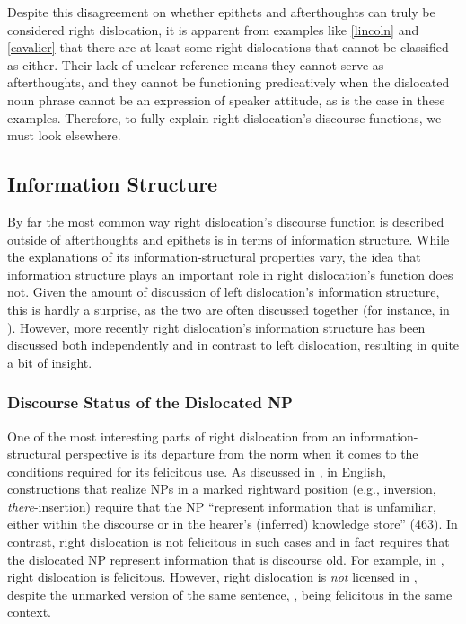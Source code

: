 \documentclass[titlepage,12pt]{article}
\begin{document}
Despite this disagreement on whether epithets and afterthoughts can truly be considered right dislocation, it is apparent from examples like \ref{lincoln} and \ref{cavalier} that there are at least some right dislocations that cannot be classified as either. Their lack of unclear reference means they cannot serve as afterthoughts, and they cannot be functioning predicatively when the dislocated noun phrase 
cannot be an expression of speaker attitude, as is the case in these examples. Therefore, to fully explain right dislocation's discourse functions, we must look elsewhere.

\subsection{Information Structure} \label{infstruc}

By far the most common way right dislocation's discourse function is described outside of afterthoughts and epithets is in terms of information structure. While the explanations of its information-structural properties vary, the idea that information structure plays an important role in right dislocation's function does not. Given the amount of discussion of left dislocation's information structure, this is hardly a surprise, as the two are often discussed together (for instance, in \citealt{davison_syntactic_1984}). However, more recently right dislocation's information structure has been discussed both independently and in contrast to left dislocation, resulting in quite a bit of insight.

\subsubsection{Discourse Status of the Dislocated NP}

One of the most interesting parts of right dislocation from an information-structural perspective is its departure from the norm when it comes to the conditions required for its felicitous use. As discussed in \citealt{ward_discourse_1996}, in English, constructions that realize NPs in a marked rightward position (e.g., inversion, \textit{there}-insertion) require that the NP ``represent information that is unfamiliar, either within the discourse or in the hearer's (inferred) knowledge store'' (463). In contrast, right dislocation is not felicitous in such cases and in fact requires that the dislocated NP represent information that is discourse old. For example, in \Next[a], right dislocation is felicitous. However, right dislocation is \emph{not} licensed in \Next[b], despite the unmarked version of the same sentence, \Next[c], being felicitous in the same context. 
\end{document}
